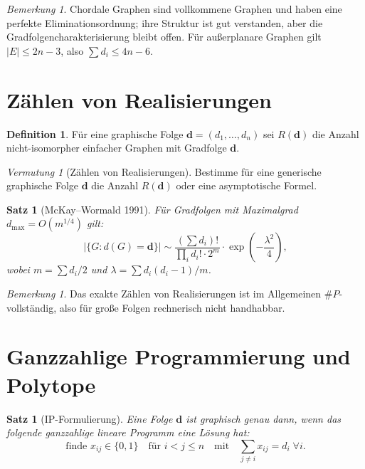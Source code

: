 \documentclass[12pt,a4paper]{amsart}
\newtheorem{satz}[theorem]{Satz}
\theoremstyle{definition}
\newtheorem{definition_de}[theorem]{Definition}
\theoremstyle{remark}
\newtheorem{bemerkung}[theorem]{Bemerkung}
\newtheorem{vermutung}[theorem]{Vermutung}
\begin{document}
\begin{bemerkung}
Chordale Graphen sind vollkommene Graphen und haben eine perfekte
Eliminationsordnung; ihre Struktur ist gut verstanden, aber die
Gradfolgencharakterisierung bleibt offen.
Für außerplanare Graphen gilt $|E| \leq 2n-3$, also $\sum d_i \leq 4n-6$.
\end{bemerkung}

\section{Zählen von Realisierungen}

\begin{definition_de}
Für eine graphische Folge $\mathbf{d} = (d_1, \ldots, d_n)$ sei
$R(\mathbf{d})$ die Anzahl nicht-isomorpher einfacher Graphen mit
Gradfolge $\mathbf{d}$.
\end{definition_de}

\begin{vermutung}[Zählen von Realisierungen]
\label{verm:zaehlen}
Bestimme für eine generische graphische Folge $\mathbf{d}$ die Anzahl
$R(\mathbf{d})$ oder eine asymptotische Formel.
\end{vermutung}

\begin{satz}[McKay--Wormald 1991]
Für Gradfolgen mit Maximalgrad $d_{\max} = O(m^{1/4})$ gilt:
\[
  |\{G : d(G) = \mathbf{d}\}| \sim \frac{(\sum d_i)!}{\prod_i d_i! \cdot 2^m}
  \cdot \exp\left(-\frac{\lambda^2}{4}\right),
\]
wobei $m = \sum d_i/2$ und $\lambda = \sum d_i(d_i-1)/m$.
\end{satz}

\begin{bemerkung}
Das exakte Zählen von Realisierungen ist im Allgemeinen $\#P$-vollständig,
also für große Folgen rechnerisch nicht handhabbar.
\end{bemerkung}

\section{Ganzzahlige Programmierung und Polytope}

\begin{satz}[IP-Formulierung]
Eine Folge $\mathbf{d}$ ist graphisch genau dann, wenn das folgende
ganzzahlige lineare Programm eine Lösung hat:
\[
  \text{finde } x_{ij} \in \{0,1\} \quad \text{für } i < j \leq n
  \quad \text{mit} \quad \sum_{j \neq i} x_{ij} = d_i \; \forall i.
\]
\end{satz}
\end{document}

